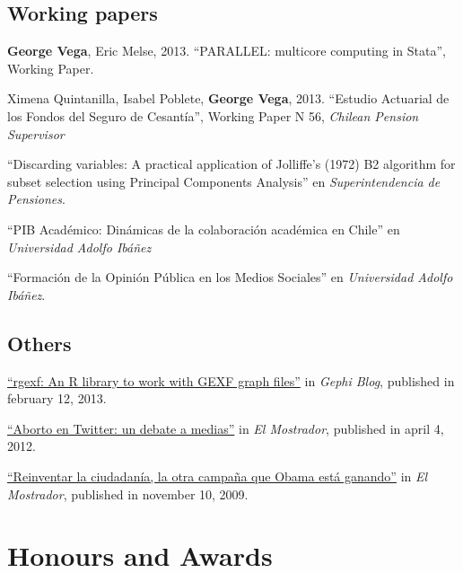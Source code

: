\documentclass[letterpaper, 12pt]{article}
\renewenvironment{itemize}{
  \begin{list}{}{
    \setlength{\leftmargin}{0.45cm}
  }
}{
  \end{list}
}
\begin{document}
\subsection*{Working papers}
\begin{itemize}
\item {\bf George Vega}, Eric Melse, 2013. ``PARALLEL: multicore computing in Stata'', Working Paper.
\item Ximena Quintanilla, Isabel Poblete, {\bf George Vega}, 2013. ``Estudio Actuarial de los Fondos del Seguro de Cesant\'ia'', Working Paper N 56, {\it Chilean Pension Supervisor}
\item ``Discarding variables: A practical application of Jolliffe's (1972) B2 algorithm for subset selection using Principal Components Analysis'' en {\it Superintendencia de Pensiones}.
\item ``PIB Académico: Dinámicas de la colaboración académica en Chile'' en {\it Universidad Adolfo Ibáñez}
\item ``Formación de la Opinión Pública en los Medios Sociales'' en {\it Universidad Adolfo Ibáñez}.
\end{itemize}

\subsection*{Others}

\begin{itemize}
\item
\href{https://gephi.org/2013/rgexf-an-r-library-to-work-with-gexf-graph-files/}{``rgexf: An R library to work with GEXF graph files''} in {\it Gephi Blog}, published in february 12, 2013.
\item \href{http://www.elmostrador.cl/opinion/2012/04/04/aborto-en-twitter-un-debate-a-medias/}{``Aborto en Twitter: un debate a medias''} in {\it El Mostrador}, published in april 4, 2012.
\item \href{http://www.uai.cl/200911165701/columna-de-opinion/columnas-opinion/reinventar-la-ciudadania-la-otra-campana-que-obama-esta-ganando}{``Reinventar la ciudadanía, la otra campaña que Obama está ganando''} in {\it El Mostrador}, published in november 10, 2009.
\end{itemize}

\section*{Honours and Awards}
\end{document}
